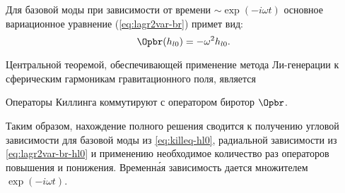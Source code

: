 \documentclass[\docroot/reports/draft/report.tex]{subfiles}
\begin{document}
\label{sec:lie-generation}

    Для базовой моды при зависимости от времени $\sim\exp(-i\omega t)$ основное вариационное уравнение (\autoref{eq:lagr2var-br}) примет вид:
    \begin{equation}\label{eq:lagr2var-br-hl0}
        \Opbr(h_{l0}) = - \omega^2 h_{l0} .
    \end{equation}

    Центральной теоремой, обеспечивающей применение метода Ли-генерации к сферическим гармоникам гравитационного поля, является
    \begin{theorem}
        Операторы Киллинга коммутируют с оператором биротор $\Opbr$.
    \end{theorem}

    Таким образом, нахождение полного решения сводится к получению угловой зависимости для базовой моды из \autoref{eq:killeq-hl0}, радиальной зависимости из \autoref{eq:lagr2var-br-hl0} и применению необходимое количество раз операторов повышения и понижения. Временн\'{а}я зависимость дается множителем $\exp(-i \omega t)$.
\end{document}
